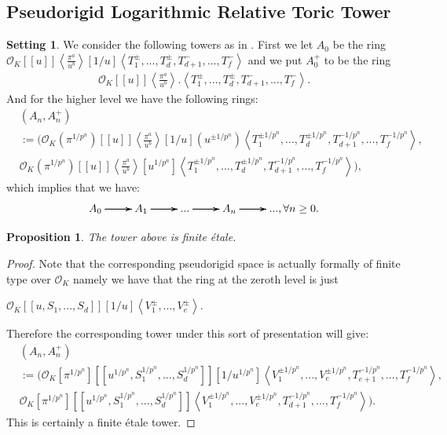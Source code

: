 \documentclass[11pt]{book}
\newtheorem{proposition}[theorem]{Proposition}
\theoremstyle{definition}
\numberwithin{equation}{section}
\newtheorem{setting}[theorem]{Setting}
\begin{document}
\newpage
\subsection{Pseudorigid Logarithmic Relative Toric Tower}


\begin{setting}
We consider the following towers as in \cite[Chapter 5]{12KL2}. First we let $A_0$ be the ring $\mathcal{O}_K[[u]]\left<\frac{\pi^a}{u^b}\right>[1/u]\left<T_1^\pm,...,T_d^\pm,T^-_{d+1},...,T^-_f\right>$ and we put $A_0^+$ to be the ring 
\begin{align}
\mathcal{O}_K[[u]]\left<\frac{\pi^a}{u^b}\right>.\left<T_1^\pm,...,T_d^\pm,T^-_{d+1},...,T^-_f\right>.	
\end{align}
And for the higher level we have the following rings:
\begin{align}
&(A_n,A_n^+)\\
&:=(\mathcal{O}_K(\pi^{1/p^n})[[u]]\left<\frac{\pi^a}{u^b}\right>[1/u](u^{\pm 1/p^n})\left<T_1^{\pm 1/p^n},...,T_d^{\pm 1/p^n},T^{-1/p^n}_{d+1},...,T^{-1/p^n}_f\right>,\\
&\mathcal{O}_K(\pi^{1/p^n})[[u]]\left<\frac{\pi^a}{u^b}\right>[u^{1/p^n}]\left<T_1^{\pm 1/p^n},...,T_d^{\pm 1/p^n},T^{-1/p^n}_{d+1},...,T^{-1/p^n}_f\right>),
\end{align}
which implies that we have:
\[
\xymatrix@C+0pc@R+0pc{
A_0\ar[r] \ar[r] \ar[r] &A_1 \ar[r] \ar[r] \ar[r] &... \ar[r] \ar[r] \ar[r] &A_n \ar[r] \ar[r] \ar[r] &..., \forall n\geq 0. 
}
\]
\end{setting}


\begin{proposition}
The tower above is finite \'etale.	
\end{proposition}

\begin{proof}
Note that the corresponding pseudorigid space is actually formally of finite type over $\mathcal{O}_K$ namely we have that the ring at the zeroth level is just
\begin{center}
 $\mathcal{O}_K[[u,S_1,...,S_d]][1/u]\left<V_1^{\pm},...,V_e^{\pm}\right>$. 
\end{center}
Therefore the corresponding tower under this sort of presentation will give:
\begin{align}
&(A_n,A_n^+)\\
&:=(\mathcal{O}_K[\pi^{1/p^n}][[u^{1/p^n},S_1^{1/p^n},...,S_d^{1/p^n}]][1/u^{1/p^n}]\left<V_1^{\pm 1/p^n},...,V_e^{\pm 1/p^n},T^{-1/p^n}_{e+1},...,T^{-1/p^n}_f\right>,\\
&\mathcal{O}_K[\pi^{1/p^n}][[u^{1/p^n},S_1^{1/p^n},...,S_d^{1/p^n}]]\left<V_1^{\pm 1/p^n},...,V_e^{\pm 1/p^n},T^{-1/p^n}_{d+1},...,T^{-1/p^n}_f\right>).
\end{align}	
This is certainly a finite \'etale tower.
\end{proof}
\end{document}

